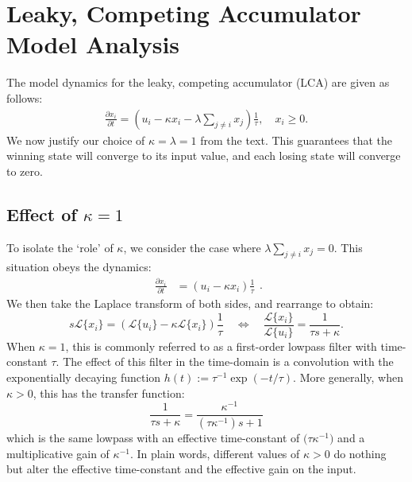 \chapter{Leaky, Competing Accumulator Model Analysis}\label{sec:apdx-wta}

The model dynamics for the leaky, competing accumulator (LCA) are given as follows:
\begin{equation}
    \begin{split}
        \frac{{\partial x}_i}{\partial t} = \left(u_i - \kappa x_i - \lambda \sum_{j \neq i} x_j\right) \frac{1}{\tau}, \quad x_i \ge 0 .
    \end{split}
\end{equation}
We now justify our choice of $\kappa = \lambda = 1$ from the text.
This guarantees that the winning state will converge to its input value, and each losing state will converge to zero.

\section{Effect of \texorpdfstring{$\kappa = 1$}{κ=1}}

To isolate the `role' of $\kappa$, we consider the case where $\lambda \sum_{j \ne i} x_j = 0$. 
This situation obeys the dynamics:
\begin{equation}
    \begin{split}
        \frac{{\partial x}_i}{\partial t} &= \left(u_i - \kappa x_i\right) 
        \frac{1}{\tau}
    \end{split}.
\end{equation}
We then take the Laplace transform of both sides, and rearrange to obtain:
\begin{equation}
    s\mathcal{L}\{x_i\} = \left( \mathcal{L}\{u_i\} - \kappa\mathcal{L}\{x_i\} \right) \frac{1}{\tau} \quad \iff \quad \frac{\mathcal{L}\{x_i\}}{\mathcal{L}\{u_i\}} = \frac{1}{\tau s + \kappa}.
\end{equation}
When $\kappa = 1$, this is commonly referred to as a first-order lowpass filter with time-constant $\tau$.
The effect of this filter in the time-domain is a convolution with the exponentially decaying function $h(t) := \tau^{-1} \exp\left( -t / \tau \right)$.
More generally, when $\kappa > 0$, this has the transfer function:
\begin{equation}
    \frac{1}{\tau s + \kappa} = \frac{\kappa^{-1}}{(\tau \kappa^{-1})s + 1}
\end{equation}
which is the same lowpass with an effective time-constant of $\big(\!\tau \kappa^{-1}\big)$ and a multiplicative gain of $\kappa^{-1}$.
In plain words, different values of $\kappa > 0$ do nothing but alter the effective time-constant and the effective gain on the input.

